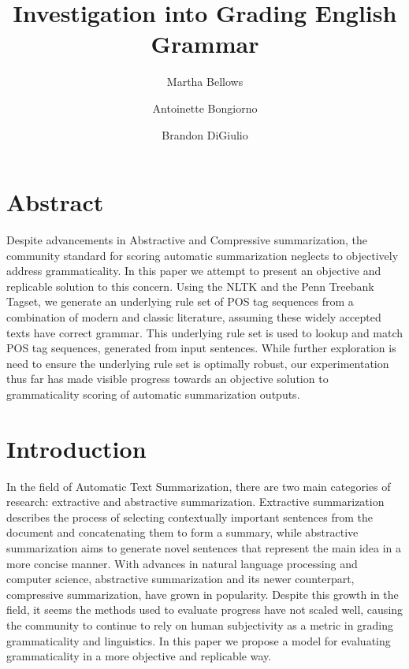 \documentclass[11pt,a4paper]{article}
\title{Investigation into Grading English Grammar}
\author{
        Martha Bellows 
\and
        Antoinette Bongiorno
\and 
	Brandon DiGiulio
}
\begin{document}
\maketitle
\pagebreak

\begin{multicols}{2}

\section{Abstract}
Despite advancements in Abstractive and Compressive summarization, the community standard for scoring automatic summarization neglects to objectively address grammaticality. In this paper we attempt to present an objective and replicable solution to this concern. Using the NLTK and the Penn Treebank Tagset, we generate an underlying rule set of POS tag sequences from a combination of modern and classic literature, assuming these widely accepted texts have correct grammar. This underlying rule set is used to lookup and match POS tag sequences, generated from input sentences. While further exploration is need to ensure the underlying rule set is optimally robust, our experimentation thus far has made visible progress towards an objective solution to grammaticality scoring of automatic summarization outputs. 

\section{Introduction}
In the field of Automatic Text Summarization, there are two main categories of research: extractive and abstractive summarization. Extractive summarization describes the process of selecting contextually important sentences from the document and concatenating them to form a summary, while abstractive summarization aims to generate novel sentences that represent the main idea in a more concise manner. With advances in natural language processing and computer science, abstractive summarization and its newer counterpart, compressive summarization, have grown in popularity. Despite this growth in the field, it seems the methods used to evaluate progress have not scaled well, causing the community to continue to rely on human subjectivity as a metric in grading grammaticality and linguistics. In this paper we propose a model for evaluating grammaticality in a more objective and replicable way.



\end{multicols}
\end{document}
